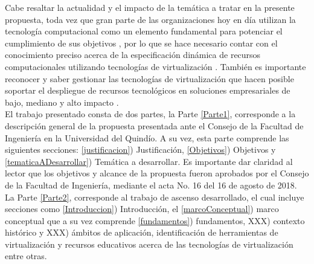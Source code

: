 Cabe resaltar la actualidad y el impacto de la temática a tratar en la presente propuesta, toda vez que gran parte de las organizaciones hoy en día utilizan la tecnología computacional como un elemento fundamental para potenciar el cumplimiento de sus objetivos \parencite{Pessolani2012}, por lo que se hace necesario contar con el conocimiento preciso acerca de la especificación dinámica de recursos computacionales utilizando tecnologías de virtualización \parencite{Hui2014}. También es importante reconocer y saber gestionar las tecnologías de virtualización que hacen posible soportar el despliegue de recursos tecnológicos en soluciones empresariales de bajo, mediano y alto impacto \parencite{Chiueh2005}. \\

El trabajo presentado consta de dos partes, la Parte \ref{Parte1}, corresponde a la descripción general de la propuesta presentada ante el Consejo de la Facultad de Ingeniería en la Universidad del Quindío. A su vez, esta parte comprende las siguientes secciones: \ref{justificacion}) Justificación, \ref{Objetivos}) Objetivos y \ref{tematicaADesarrollar}) Temática a desarrollar. Es importante dar claridad al lector que los objetivos y alcance de la propuesta fueron aprobados por el Consejo de la Facultad de Ingeniería, mediante el acta No. 16 del 16 de agosto de 2018. La Parte \ref{Parte2}, corresponde al trabajo de ascenso desarrollado, el cual incluye secciones como  \ref{Introduccion}) Introducción, el  \ref{marcoConceptual}) marco conceptual que a su vez comprende \ref{fundamentos}) fundamentos, XXX) contexto histórico y XXX) ámbitos de aplicación, identificación de herramientas de virtualización y recursos educativos acerca de las tecnologías de virtualización entre otras.\\